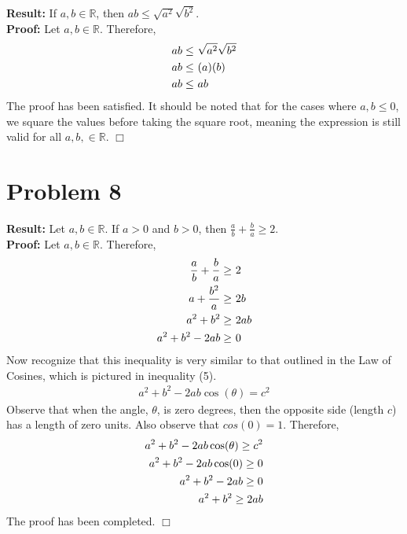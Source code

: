 \documentclass[11pt]{article}
\begin{document}
    \textbf{Result:} If $a, b \in \mathbb{R}$, then $ab \leq \sqrt{a^2}\sqrt{b^2}$.
    \\
    \textbf{Proof:} Let $a, b \in \mathbb{R}$. Therefore, 
    \begin{align}
        ab \leq& \ \sqrt{a^2}\sqrt{b^2} \notag \\
        ab \leq& \ (a)(b) \notag \\
        ab \leq& \ ab
    \end{align}
    The proof has been satisfied. It should be noted that for the cases where $a, b \leq 0$, we square the values before taking the square root, meaning the expression is still valid for all $a, b, \in \mathbb{R}$.
    \hfill $\Box$

\newpage



\section*{Problem 8}

    \textbf{Result:} Let $a, b \in \mathbb{R}$. If $a>0$ and $b>0$, then $\frac{a}{b}+\frac{b}{a} \geq 2$.
    \\
    \textbf{Proof:} Let $a, b \in \mathbb{R}$. Therefore, 
    \begin{align}
        \frac{a}{b}+\frac{b}{a} \geq& \ 2 \notag \\
        a+\frac{b^2}{a} \geq& \ 2b \notag \\
        a^2+b^2 \geq& \ 2ab \notag \\
        a^2 + b^2 -2ab \geq& \ 0 \notag
    \end{align}
    Now recognize that this inequality is very similar to that outlined in the Law of Cosines, which is pictured in inequality (5).
    \begin{align}
         a^2 + b^2 -2ab\cos(\theta) = c^2 
    \end{align}
    Observe that when the angle, $\theta$, is zero degrees, then the opposite side (length $c$) has a length of zero units. Also observe that $cos(0) = 1$. Therefore,
    \begin{align}
        a^2 + b^2 -2ab\cos(\theta) \geq c^2 \notag \\
        a^2 + b^2 -2ab\cos(0) \geq 0 \notag \\
        a^2 + b^2 -2ab \geq 0 \notag \\
        a^2 + b^2 \geq 2ab \notag
    \end{align}
    The proof has been completed.
    \hfill $\Box$

\newpage
\end{document}

